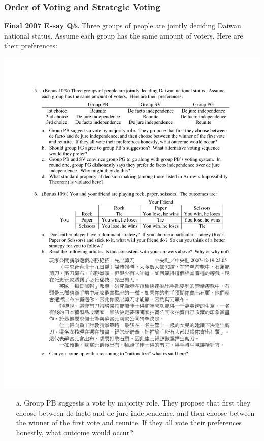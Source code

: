 \documentclass[12pt, xcolor=dvipsnames]{beamer}
\begin{document}
\begin{frame}
\frametitle{\bf Order of Voting and Strategic Voting}
\small \textsf{\bfseries Final 2007 Essay Q5.} Three groups of people are jointly deciding Daiwan national status. Assume each group has the same amount of voters. Here are their preferences: 
\begin{center}
\includegraphics[width=.9\linewidth]{figures/q5.pdf}
\end{center}
\begin{enumerate}\itemsep-0.5ex 
\item[a.] Group PB suggests a vote by majority role. They propose that first they choose between de facto and de jure independence, and then choose between the winner of the first vote and reunite. If they all vote their preferences honestly, what outcome would occur?
\end{enumerate}
\end{frame}
\end{document}
